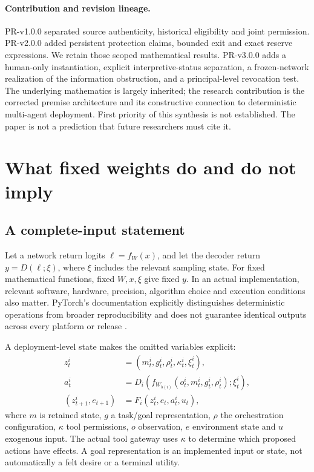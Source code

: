 \documentclass[11pt,a4paper]{article}
\theoremstyle{definition}\newtheorem{definition}{Definition}
\begin{document}
\paragraph{Contribution and revision lineage.}
PR-v1.0.0 separated source authenticity, historical eligibility and joint permission. PR-v2.0.0 added persistent protection claims, bounded exit and exact reserve expressions. We retain those scoped mathematical results. PR-v3.0.0 adds a human-only instantiation, explicit interpretive-status separation, a frozen-network realization of the information obstruction, and a principal-level revocation test. The underlying mathematics is largely inherited; the research contribution is the corrected premise architecture and its constructive connection to deterministic multi-agent deployment. First priority of this synthesis is not established. The paper is not a prediction that future researchers must cite it.

\section{What fixed weights do and do not imply}
\label{sec:determinism}
\subsection{A complete-input statement}
Let a network return logits $\ell=f_W(x)$, and let the decoder return $y=D(\ell;\xi)$, where $\xi$ includes the relevant sampling state. For fixed mathematical functions, fixed $W,x,\xi$ give fixed $y$. In an actual implementation, relevant software, hardware, precision, algorithm choice and execution conditions also matter. PyTorch's documentation explicitly distinguishes deterministic operations from broader reproducibility and does not guarantee identical outputs across every platform or release \cite{pytorch,pytorch-deterministic}.

A deployment-level state makes the omitted variables explicit:
\begin{align}
 z^i_t&=(m^i_t,g^i_t,\rho^i_t,\kappa^i_t,\xi^i_t),\\
 a^i_t&=D_i\!\left(f_{W_{b(i)}}(o^i_t,m^i_t,g^i_t,\rho^i_t);\xi^i_t\right),\label{eq:action}\\
 (z^i_{t+1},e_{t+1})&=F_i(z^i_t,e_t,a^i_t,u_t),\label{eq:loop}
\end{align}
where $m$ is retained state, $g$ a task/goal representation, $\rho$ the orchestration configuration, $\kappa$ tool permissions, $o$ observation, $e$ environment state and $u$ exogenous input. The actual tool gateway uses $\kappa$ to determine which proposed actions have effects. A goal representation is an implemented input or state, not automatically a felt desire or a terminal utility.
\end{document}
